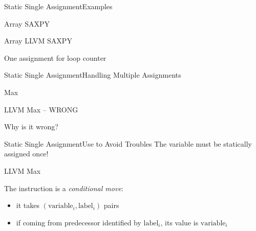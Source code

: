 \begin{frame}{Static Single Assignment}{Examples}
\begin{block}{Array SAXPY}
\end{block}

\begin{block}{Array LLVM SAXPY}
\end{block}

One assignment for loop counter 
\end{frame}

\begin{frame}{Static Single Assignment}{Handling Multiple Assignments}
\begin{block}{Max}
\end{block}

\begin{block}{LLVM Max -- WRONG}
\end{block}

Why is it \alert{wrong}?
\end{frame}


\begin{frame}{Static Single Assignment}{Use  to Avoid Troubles}
The  variable must be statically assigned once!

\begin{block}{LLVM Max}
\end{block}

The  instruction is a \emph{conditional move}:

\begin{itemize}
\item it takes $(\textrm{variable}_i, \textrm{label}_i)$ pairs
\item if coming from predecessor identified by $\textrm{label}_i$, its value is $\textrm{variable}_i$
\end{itemize}
\end{frame}



